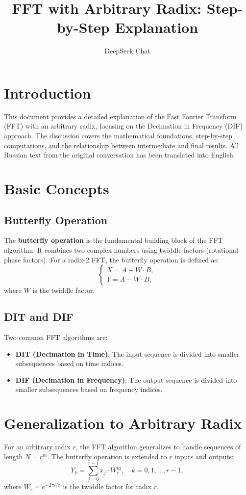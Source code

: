 \documentclass{article}
\title{FFT with Arbitrary Radix: Step-by-Step Explanation}
\author{DeepSeek Chat}
\date{}
\begin{document}
\maketitle

\section{Introduction}
This document provides a detailed explanation of the Fast Fourier Transform (FFT) with an arbitrary radix, focusing on the Decimation in Frequency (DIF) approach. The discussion covers the mathematical foundations, step-by-step computations, and the relationship between intermediate and final results. All Russian text from the original conversation has been translated into English.

\section{Basic Concepts}
\subsection{Butterfly Operation}
The \textbf{butterfly operation} is the fundamental building block of the FFT algorithm. It combines two complex numbers using twiddle factors (rotational phase factors). For a radix-2 FFT, the butterfly operation is defined as:
\[
\begin{cases}
X = A + W \cdot B, \\
Y = A - W \cdot B,
\end{cases}
\]
where \( W \) is the twiddle factor.

\subsection{DIT and DIF}
Two common FFT algorithms are:
\begin{itemize}
    \item \textbf{DIT (Decimation in Time)}: The input sequence is divided into smaller subsequences based on time indices.
    \item \textbf{DIF (Decimation in Frequency)}: The output sequence is divided into smaller subsequences based on frequency indices.
\end{itemize}

\section{Generalization to Arbitrary Radix}
For an arbitrary radix \( r \), the FFT algorithm generalizes to handle sequences of length \( N = r^m \). The butterfly operation is extended to \( r \) inputs and outputs:
\[
Y_k = \sum_{j=0}^{r-1} x_j \cdot W_r^{kj}, \quad k = 0, 1, \dots, r-1,
\]
where \( W_r = e^{-2\pi i / r} \) is the twiddle factor for radix \( r \).
\end{document}
